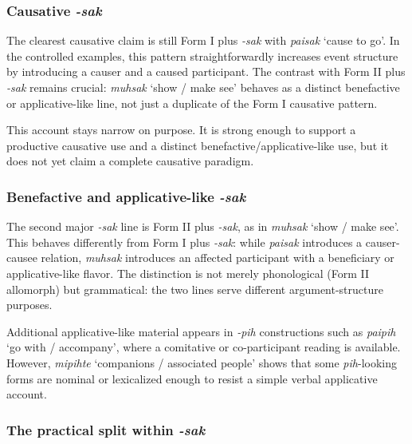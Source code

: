 \documentclass[
  11pt,
  a4paper,
]{article}
\newcommand{\tdim}[1]{\textit{#1}}
\newcommand{\glossquote}[1]{`#1'}
\begin{document}
\subsubsection{\texorpdfstring{Causative
\tdim{-sak}}{Causative }}\label{causative}

The clearest causative claim is still Form I plus \tdim{-sak} with
\tdim{paisak} \glossquote{cause to go}. In the controlled examples, this
pattern straightforwardly increases event structure by introducing a
causer and a caused participant. The contrast with Form II plus
\tdim{-sak} remains crucial: \tdim{muhsak} \glossquote{show / make see}
behaves as a distinct benefactive or applicative-like line, not just a
duplicate of the Form I causative pattern.

This account stays narrow on purpose. It is strong enough to support a
productive causative use and a distinct benefactive/applicative-like
use, but it does not yet claim a complete causative paradigm.

\subsubsection{\texorpdfstring{Benefactive and applicative-like
\tdim{-sak}}{Benefactive and applicative-like }}\label{benefactive-and-applicative-like}

The second major \tdim{-sak} line is Form II plus \tdim{-sak}, as in
\tdim{muhsak} \glossquote{show / make see}. This behaves differently
from Form I plus \tdim{-sak}: while \tdim{paisak} introduces a
causer-causee relation, \tdim{muhsak} introduces an affected participant
with a beneficiary or applicative-like flavor. The distinction is not
merely phonological (Form II allomorph) but grammatical: the two lines
serve different argument-structure purposes.

Additional applicative-like material appears in \tdim{-pih}
constructions such as \tdim{paipih} \glossquote{go with / accompany},
where a comitative or co-participant reading is available. However,
\tdim{mipihte} \glossquote{companions / associated people} shows that
some \tdim{pih}-looking forms are nominal or lexicalized enough to
resist a simple verbal applicative account.

\subsubsection{\texorpdfstring{The practical split within
\tdim{-sak}}{The practical split within }}\label{the-practical-split-within}
\end{document}
